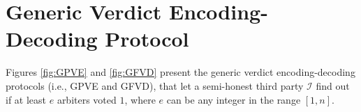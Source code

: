 
\section{Generic Verdict Encoding-Decoding Protocol}\label{sec::Generic-Verdict-Encoding-Decoding-Protocols}

Figures \ref{fig:GPVE} and \ref{fig:GFVD} present the generic verdict encoding-decoding protocols (i.e., GPVE and GFVD), that let a semi-honest third party $\mathcal{I}$ find out if at least $e$ arbiters voted $1$, where $e$ can be any integer in the range $[1, n]$.


%
%
%
%
% 
% 
% 
% 
% 
